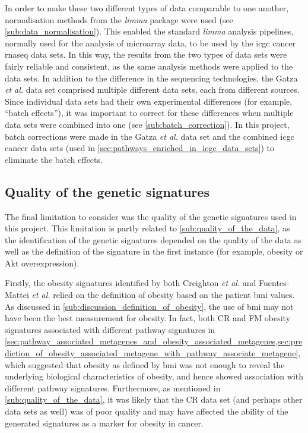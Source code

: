 In order to make these two different types of data comparable to one another, normalisation methods from the \textit{limma} package were used (see \cref{sub:data_normalisation}).
This enabled the standard \textit{limma} analysis pipelines, normally used for the analysis of microarray data, to be used by the \gls{icgc} cancer \gls{rnaseq} data sets.
In this way, the results from the two types of data sets were fairly reliable and consistent, as the same analysis methods were applied to the data sets.
In addition to the difference in the sequencing technologies, the Gatza \textit{et al.} data set comprised multiple different data sets, each from different sources.
Since individual data sets had their own experimental differences (for example, ``batch effects''), it was important to correct for these differences when multiple data sets were combined into one (see \cref{sub:batch_correction}).
In this project, batch corrections were made in the Gatza \textit{et al.} data set and the combined \gls{icgc} cancer data sets (used in \cref{sec:pathways_enriched_in_icgc_data_sets}) to eliminate the batch effects.

\subsection{Quality of the genetic signatures}
\label{sub:quality_of_the_genetic_signatures}

The final limitation to consider was the quality of the genetic signatures used in this project.
This limitation is partly related to \cref{sub:quality_of_the_data}, as  the identification of the  genetic signatures depended  on the quality of the data as well as the definition  of the signature in the first instance (for example,  obesity or Akt overexpression).

Firstly, the obesity signatures identified by both Creighton \textit{et al.} and Fuentes-Mattei \textit{et al.} relied on the definition of obesity based on the patient \gls{bmi} values.
As discussed in \cref{sub:discussion_definition_of_obesity}, the use of \gls{bmi} may not have been the best measurement for obesity.
In fact, both CR and FM obesity signatures associated with different pathway signatures in \cref{sec:pathway_associated_metagenes_and_obesity_associated_metagenes,sec:prediction_of_obesity_associated_metagene_with_pathway_associate_metagene}, which suggested that obesity as defined by \gls{bmi} was not enough to reveal the underlying biological characteristics of obesity, and hence showed association with different pathway signatures.
Furthermore, as mentioned in \cref{sub:quality_of_the_data}, it was likely that the CR data set (and perhaps other data sets as well) was of poor quality and may have affected the ability of the generated signatures as a marker for obesity in cancer.

